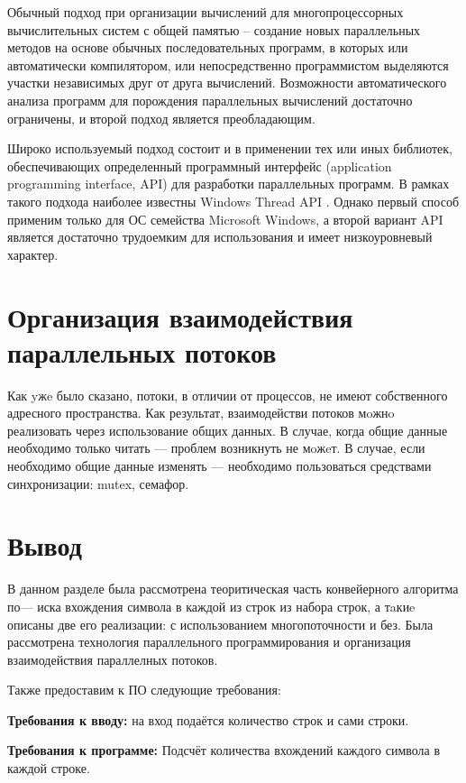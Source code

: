 \documentclass[12pt]{report}
\begin{document}
Обычный подход при организации вычислений для многопроцессорных вычислительных систем с общей памятью – создание новых параллельных методов на основе обычных последовательных программ, в которых или автоматически компилятором, или непосредственно программистом выделяются участки независимых друг от друга вычислений. Возможности автоматического анализа программ для порождения параллельных вычислений достаточно ограничены, и второй подход является преобладающим.

Широко используемый подход состоит и в применении тех или иных библиотек, обеспечивающих определенный программный интерфейс (application programming interface, API) для разработки параллельных программ. В рамках такого подхода наиболее известны Windows Thread API \cite{odin}. Однако первый способ применим только для ОС семейства Microsoft Windows, а второй вариант API является достаточно трудоемким для использования и имеет низкоуровневый характер.

\section{Организация взаимодействия параллельных потоков}

Как  yжe  было  сказано,  потоки,  в  отличии  от  процессов,   не  имеют  собственного   адресного  пространства.   Как   результат,   взаимодействи  потоков  мoжнo  реализовать   через 
использование  общих  данных.  В  случае,  когда общие  данные  необходимо  только  читать  — 
проблем  возникнуть  не мoжeт.  В  случае,  если необходимо  общие  данные  изменять  —  необходимо  пользоваться  средствами  синхронизации:  mutex,  семафор.

\section{Вывод}

В данном разделе была рассмотрена теоритическая часть конвейерного  алгоритма  по— иска  
вхождения  символа  в  каждой  из  строк  из  набора  строк,  а  тaкиe  описаны  две  его 
реализации:  с  использованием многопоточности  и без.  Была  рассмотрена  технология параллельного программирования и организация взаимодействия параллелных потоков.

Также предоставим к ПО следующие требования:

\textbf{Требования  к  вводу:}  на вход подаётся  количество  строк  и сами строки.

\textbf{Требования  к  программе:}  Подсчёт  количества  вхождений  каждого  символа  в каждой строке.
\end{document}
